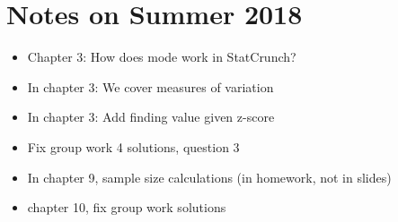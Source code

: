 \documentclass{article}
\begin{document}
\section{Notes on Summer 2018}

\begin{itemize}
\item Chapter 3: How does mode work in StatCrunch?

\item In chapter 3: We cover  measures of variation

\item In chapter 3: Add finding value given z-score

\item Fix group work 4 solutions, question 3

\item In chapter 9, sample size calculations (in homework, not in slides)

\item chapter 10, fix group work solutions

\end{itemize}
\end{document}
